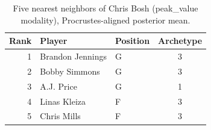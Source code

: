 \begin{table}[htbp]
  \centering\small
  \begin{tabular}{rllc}
    \toprule
    Rank & Player & Position & Archetype \\
    \midrule
    1 & Brandon Jennings & G & 3 \\
    2 & Bobby Simmons & G & 3 \\
    3 & A.J. Price & G & 1 \\
    4 & Linas Kleiza & F & 3 \\
    5 & Chris Mills & F & 3 \\
    \bottomrule
  \end{tabular}
  \caption{Five nearest neighbors of Chris Bosh (peak_value modality), Procrustes-aligned posterior mean.}
  \label{tab:Chris_Bosh_neighbors_peak_value}
\end{table}

